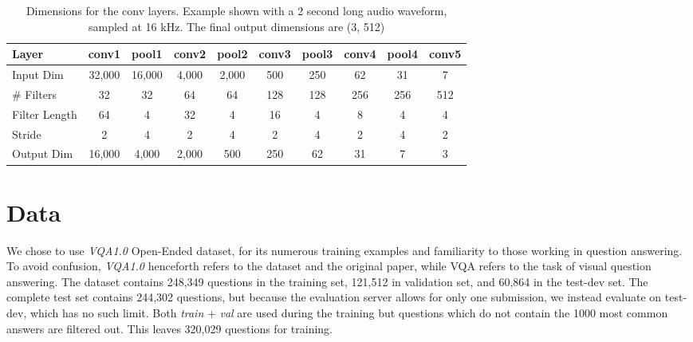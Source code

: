\documentclass[letterpaper]{article} %
\begin{document}
\begin{table}[!ht]
\centering
\caption{Dimensions for the conv layers. Example shown with a 2 second long audio waveform, sampled at 16 kHz. The final output dimensions are (3, 512)}
\label{table:convdims}
\begin{tabular}{l|c|c|c|c|c|c|c|c|c}
Layer         & \multicolumn{1}{l|}{conv1} & \multicolumn{1}{l|}{pool1} & \multicolumn{1}{l|}{conv2} & \multicolumn{1}{l|}{pool2} & \multicolumn{1}{l|}{conv3} & \multicolumn{1}{l|}{pool3} & \multicolumn{1}{l|}{conv4} & \multicolumn{1}{l|}{pool4} & \multicolumn{1}{l}{conv5} \\ \hline
Input Dim     & 32,000                      & 16,000                      & 4,000                       & 2,000                       & 500                        & 250                        & 62                         & 31                         & 7                         \\
\# Filters    & 32                         & 32                         & 64                         & 64                         & 128                        & 128                        & 256                        & 256                        & 512                       \\
Filter Length & 64                         & 4                          & 32                         & 4                          & 16                         & 4                          & 8                          & 4                          & 4                         \\
Stride        & 2                          & 4                          & 2                          & 4                          & 2                          & 4                          & 2                          & 4                          & 2                         \\
Output Dim    & 16,000                      & 4,000                       & 2,000                       & 500                        & 250                        & 62                         & 31                         & 7                          & 3                        
\end{tabular}
\end{table}



\section{Data}
We chose to use \textit{VQA1.0} Open-Ended dataset, for its numerous training examples and familiarity to those working in question answering. To avoid confusion, \textit{VQA1.0} henceforth refers to the dataset and the original paper, while VQA refers to the task of visual question answering. The dataset contains 248,349 questions in the training set, 121,512 in validation set, and 60,864 in the test-dev set. The complete test set contains 244,302 questions, but because the evaluation server allows for only one submission, we instead evaluate on test-dev, which has no such limit. Both \textit{train} + \textit{val} are used during the training but questions which do not contain the 1000 most common answers are filtered out. This leaves 320,029 questions for training.
\end{document}
